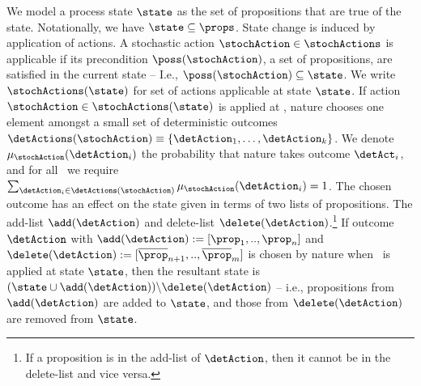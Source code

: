 \documentclass[letterpaper]{article}
\begin{document}
We model a process state $\state$ as the set of propositions that are
true of the state. Notationally, we have $\state \subseteq
\props$. State change is induced by application of actions. A
stochastic action $\stochAction \in \stochActions$ is applicable if
its precondition $\poss(\stochAction)$, a set of propositions, are
satisfied in the current state -- I.e., $\poss(\stochAction) \subseteq
\state$. We write $\stochActions(\state)$ for set of actions
applicable at state $\state$.  If action $\stochAction \in
\stochActions(\state)$ is applied at \state, nature chooses one
element amongst a small set of deterministic outcomes
$\detActions(\stochAction) \equiv \{\detAction_1, \ldots, \detAction_k
\}$. We denote $\mu_{\stochAction}(\detAction_i)$ the probability that
nature takes outcome $\detAct_i$, and for all \stochAction\ we require
$\sum_{\detAction_i \in \detActions(\stochAction)}
\mu_{\stochAction}(\detAction_i) = 1$. The chosen outcome has an
effect on the state given in terms of two lists of propositions. The
add-list $\add(\detAction)$ and delete-list
$\delete(\detAction)$.\footnote{If a proposition is in the add-list of
$\detAction$, then it cannot be in the delete-list and vice versa.}
If outcome $\detAction$ with $\add(\detAction) := [\prop_1,
..,\prop_n]$ and $\delete(\detAction) := [\overline\prop_{n+1},
..,\overline\prop_m]$ is chosen by nature when \stochAction\ is
applied at state $\state$, then the resultant state is $ ( \state \cup
\add(\detAction) ) \backslash \delete(\detAction)$ -- i.e.,
propositions from $\add(\detAction)$ are added to $\state$, and those
from $\delete(\detAction)$ are removed from $\state$.
\end{document}
